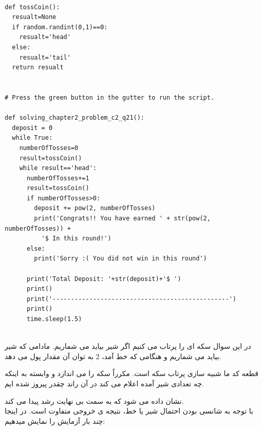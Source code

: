 \documentclass[a4paper,14pt]{article}
\begin{document}
	\begin{latin}
		\begin{lstlisting}
			
def tossCoin():
  resualt=None
  if random.randint(0,1)==0:
    resualt='head'
  else:
    resualt='tail'
  return resualt


# Press the green button in the gutter to run the script.

def solving_chapter2_problem_c2_q21():
  deposit = 0
  while True:
    numberOfTosses=0
    result=tossCoin()
    while result=='head':
      numberOfTosses+=1
      result=tossCoin()
      if numberOfTosses>0:
        deposit += pow(2, numberOfTosses)
        print('Congrats!! You have earned ' + str(pow(2, numberOfTosses)) +
          '$ In this round!')
      else:
        print('Sorry :( You did not win in this round')

      print('Total Deposit: '+str(deposit)+'$ ')
      print()
      print('------------------------------------------------')
      print()
      time.sleep(1.5)
			
		\end{lstlisting}
	\end{latin}
	\fontsize{14}{14}\selectfont 
	
	
	
	در این سوال سکه ای را پرتاب می کنیم اگر شیر بیاید می شماریم. مادامی که شیر بیاید می شماریم و هنگامی که خط آمد، 2 به توان آن مقدار پول می دهد.
	
	\noindent قطعه کد ما شبیه سازی پرتاب سکه است. مکرراً سکه را می اندازد و وابسته به اینکه چه تعدادی شیر آمده اعلام می کند در آن راند چقدر پیروز شده ایم.
	
	\noindent نشان داده می شود که به سمت بی نهایت رشد پیدا می کند.\\
	
	با توجه به شانسی بودن احتمال شیر یا خط، نتیجه ی خروجی متفاوت است. در اینجا چند بار آزمایش را نمایش میدهیم:\\
	
\end{document}
